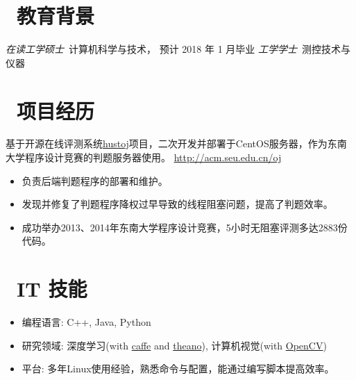 \documentclass{resume}
\begin{document}

 
\section{\faGraduationCap\  教育背景}
\textit{在读工学硕士}\ 计算机科学与技术， 预计 2018 年 1 月毕业
\textit{工学学士}\ 测控技术与仪器

\section{\faUsers\ 项目经历}
\begin{onehalfspacing}
基于开源在线评测系统\href{https://github.com/zhblue/hustoj}{hustoj}项目，二次开发并部署于CentOS服务器，作为东南大学程序设计竞赛的判题服务器使用。
 \href{http://acm.seu.edu.cn/oj/}{http://acm.seu.edu.cn/oj}
\begin{itemize}
  \item 负责后端判题程序的部署和维护。
  \item 发现并修复了判题程序降权过早导致的线程阻塞问题，提高了判题效率。
  \item 成功举办2013、2014年东南大学程序设计竞赛，5小时无阻塞评测多达2883份代码。
\end{itemize}
\end{onehalfspacing}


\section{\faCogs\ IT 技能}
\begin{itemize}[parsep=0.5ex]
  \item 编程语言: C++, Java, Python
  \item 研究领域: 深度学习(with \href{http://caffe.berkeleyvision.org/}{caffe} and \href{http://deeplearning.net/software/theano/}{theano}), 计算机视觉(with \href{http://opencv.org/}{OpenCV})
  \item 平台: 多年Linux使用经验，熟悉命令与配置，能通过编写脚本提高效率。
\end{itemize}
\end{document}
